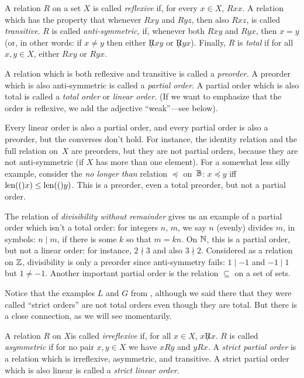 \documentclass[open-logic-section]{subfiles}
\begin{document}

\begin{defn}
A relation $R$ on a set $X$ is called \emph{reflexive} if, for every
$x\in X$, $Rxx$. A relation which has the property that whenever $Rxy$
and $Ryz$, then also $Rxz$, is called \emph{transitive}.  $R$ is
called \emph{anti-symmetric,} if, whenever both $Rxy$ and $Ryx$, then
$x=y$ (or, in other words: if $x\neq y$ then either $\not Rxy$ or
$\not Ryx$). Finally, $R$ is \emph{total} if for all $x,y\in X$,
either $Rxy$ or $Ryx$.

A relation which is both reflexive and transitive is called a
\emph{preorder.}  A preorder which is also anti-symmetric is called a
\emph{partial order}. A partial order which is also total is called a
\emph{total order} or \emph{linear order.} (If we want to emphasize
that the order is reflexive, we add the adjective ``weak''---see
below).
\end{defn}

\begin{ex}
Every linear order is also a partial order, and every partial order is
also a preorder, but the converses don't hold. For instance, the
identity relation and the full relation on~$X$ are preorders, but they
are not partial orders, because they are not anti-symmetric (if $X$
has more than one element). For a somewhat less silly example,
consider the \emph{no longer than} relation $\preccurlyeq$
on~$\mathbb{B}$: $x\preccurlyeq y$ iff $\mathrm{len}(()x)\le\mathrm{len}(()y)$. This is a
preorder, even a total preorder, but not a partial order.

The relation of \emph{divisibility without remainder} gives us an
example of a partial order which isn't a total order: for integers
$n$, $m$, we say $n$ (evenly) divides $m$, in symbols: $n\mid m$, if
there is some $k$ so that $m=kn$.  On $\mathbb{N}$, this is a partial order,
but not a linear order: for instance, $2\nmid3$ and also
$3\nmid2$. Considered as a relation on $\mathbb{Z}$, divisibility is only a
preorder since anti-symmetry fails: $1\mid-1$ and $-1\mid1$ but
$1\neq-1$. Another important partial order is the relation $\subseteq$
on a set of sets.

Notice that the examples $L$ and $G$ from ,
although we said there that they were called ``strict orders'' are not
total orders even though they are total. But there is a close
connection, as we will see momentarily.
\end{ex}

\begin{defn}
A relation $R$ on $X$is called \emph{irreflexive} if, for all $x\in
X$, $x\not Rx$. $R$ is called \emph{asymmetric} if for no pair $x,y\in
X$ we have $xRy$ and $yRx$. A \emph{strict partial order} is a
relation which is irreflexive, asymmetric, and transitive. A strict
partial order which is also linear is called a \emph{strict linear
  order.}
\end{defn}
\end{document}
